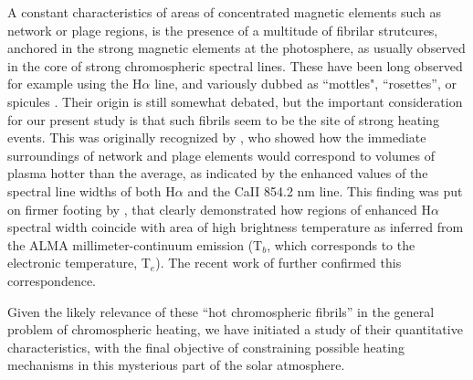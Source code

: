 \documentclass{iau}
\begin{document}
A constant characteristics of areas of concentrated magnetic elements such as network or plage regions, is the presence of a multitude of fibrilar strutcures, anchored
in the strong magnetic elements at the photosphere, as usually observed in the core of strong chromospheric spectral lines. These have been long observed for
example
using the H$\alpha$ line, and variously dubbed as  ``mottles", ``rosettes'', or spicules \citep[][among many]{1968SoPh....3..367B, 2006ASPC..354..276R,2012SSRv..169..181T}. 
Their origin is still somewhat debated, but the important consideration for our present study is that such fibrils seem to be the site of strong heating events. This was originally recognized by \citet{2009A&A...503..577C},
who showed how the immediate surroundings of network and plage elements would correspond to volumes of plasma hotter than the average, as indicated by the enhanced values of the spectral line widths of both H$\alpha$ and the CaII 854.2 nm line. This finding was put on firmer footing 
by \citet{2019ApJ...881...99M}, that clearly demonstrated how regions of enhanced H$\alpha$ spectral width coincide with area of high brightness temperature as inferred from the ALMA millimeter-continuum emission  (T$_b$, which
corresponds to the electronic temperature, T$_e$). The recent work of \citet{2023FrASS...9.8405T} further confirmed this correspondence.

Given the likely relevance of these ``hot chromospheric fibrils'' in the general problem of chromospheric heating, we have initiated a study of their quantitative characteristics, with the final objective of constraining possible heating mechanisms in this mysterious part of the solar atmosphere.  
\end{document}
